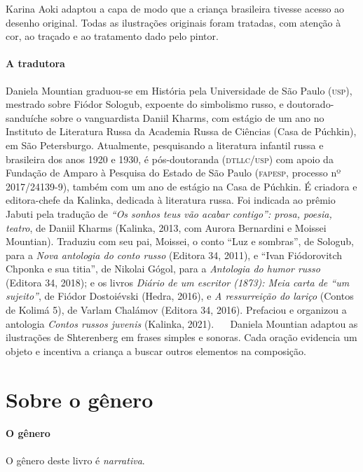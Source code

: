 \documentclass[11pt]{extarticle}
\begin{document}
Karina Aoki adaptou a capa de modo que a criança brasileira tivesse acesso ao
desenho original. Todas as ilustrações originais foram tratadas, com atenção à cor, ao traçado e ao tratamento dado pelo pintor.

\paragraph{A tradutora} 
Daniela Mountian graduou-se em História pela Universidade de São Paulo (\textsc{usp}), mestrado sobre Fiódor Sologub, expoente do simbolismo russo, e doutorado-sanduíche sobre o vanguardista Daniil Kharms, com estágio de um ano no Instituto de Literatura Russa da Academia Russa de Ciências (Casa de Púchkin), em São Petersburgo. Atualmente, pesquisando a literatura infantil russa e brasileira dos anos 1920 e 1930, é pós-doutoranda (\textsc{dtllc/usp}) com apoio da Fundação de Amparo à Pesquisa do Estado de São Paulo (\textsc{fapesp}, processo nº 2017/24139-9), também com um ano de estágio na Casa de Púchkin. É criadora e editora-chefe da Kalinka, dedicada à literatura russa. Foi indicada ao prêmio Jabuti pela tradução de \textit{“Os sonhos teus vão acabar contigo”: prosa, poesia, teatro}, de Daniil Kharms (Kalinka, 2013, com Aurora Bernardini e Moissei Mountian). Traduziu com seu pai, Moissei, o conto “Luz e sombras”, de Sologub, para a \textit{Nova antologia do conto russo} (Editora 34, 2011), e “Ivan Fiódorovitch Chponka e sua titia”, de Nikolai Gógol, para a \textit{Antologia do humor russo} (Editora 34, 2018); e os livros \textit{Diário de um escritor (1873): Meia carta de “um sujeito”}, de Fiódor Dostoiévski (Hedra, 2016), e \textit{A ressurreição do lariço} (Contos de Kolimá 5), de Varlam Chalámov (Editora 34, 2016). Prefaciou e organizou a antologia \textit{Contos russos juvenis} (Kalinka, 2021).
 
Daniela Mountian adaptou as ilustrações de Shterenberg em frases simples e sonoras. Cada oração evidencia um objeto e incentiva a criança a buscar outros elementos na composição.

\section{Sobre o gênero}

\paragraph{O gênero} O gênero deste livro é \textit{narrativa}. 
\end{document}
